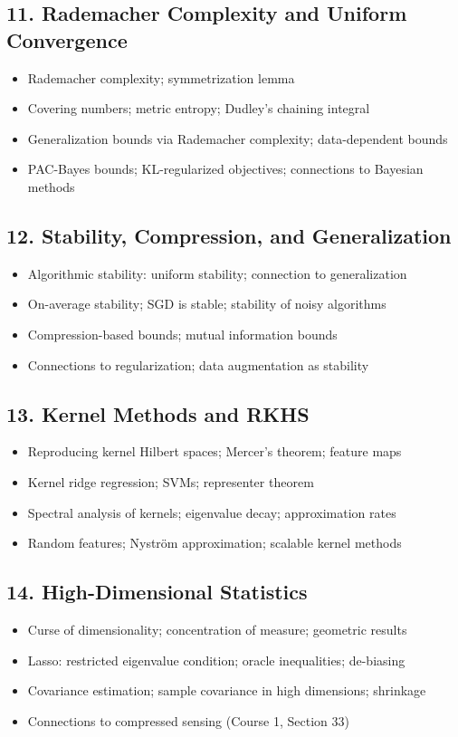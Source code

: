 \subsection{11. Rademacher Complexity and Uniform Convergence}
\begin{itemize}
\item Rademacher complexity; symmetrization lemma
\item Covering numbers; metric entropy; Dudley's chaining integral
\item Generalization bounds via Rademacher complexity; data-dependent bounds
\item PAC-Bayes bounds; KL-regularized objectives; connections to Bayesian methods
\end{itemize}

\subsection{12. Stability, Compression, and Generalization}
\begin{itemize}
\item Algorithmic stability: uniform stability; connection to generalization
\item On-average stability; SGD is stable; stability of noisy algorithms
\item Compression-based bounds; mutual information bounds
\item Connections to regularization; data augmentation as stability
\end{itemize}

\subsection{13. Kernel Methods and RKHS}
\begin{itemize}
\item Reproducing kernel Hilbert spaces; Mercer's theorem; feature maps
\item Kernel ridge regression; SVMs; representer theorem
\item Spectral analysis of kernels; eigenvalue decay; approximation rates
\item Random features; Nystr\"om approximation; scalable kernel methods
\end{itemize}

\subsection{14. High-Dimensional Statistics}
\begin{itemize}
\item Curse of dimensionality; concentration of measure; geometric results
\item Lasso: restricted eigenvalue condition; oracle inequalities; de-biasing
\item Covariance estimation; sample covariance in high dimensions; shrinkage
\item Connections to compressed sensing (Course 1, Section 33)
\end{itemize}

